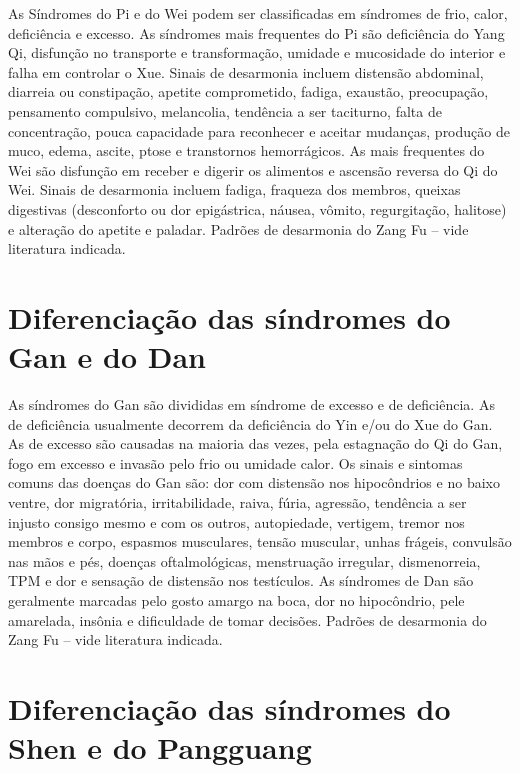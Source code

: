 \documentclass[12pt,oneside,a4paper]{book} %
\begin{document}
As Síndromes do Pi e do Wei podem ser classificadas em síndromes de frio, calor, deficiência e excesso. 
As síndromes mais frequentes do Pi são deficiência do Yang Qi, disfunção no transporte e transformação, umidade e mucosidade do interior e falha em controlar o Xue. Sinais de desarmonia incluem distensão abdominal, diarreia ou constipação, apetite comprometido, fadiga, exaustão, preocupação, pensamento compulsivo, melancolia, tendência a ser taciturno, falta de concentração, pouca capacidade para reconhecer e aceitar mudanças, produção de muco, edema, ascite, ptose e transtornos hemorrágicos.
As mais frequentes do Wei são disfunção em receber e digerir os alimentos e ascensão reversa do Qi do Wei. Sinais de desarmonia incluem fadiga, fraqueza dos membros, queixas digestivas (desconforto ou dor epigástrica, náusea, vômito, regurgitação, halitose) e alteração do apetite e paladar.
Padrões de desarmonia do Zang Fu – vide literatura indicada.

\section{Diferenciação das síndromes do Gan e do Dan}

As síndromes do Gan são divididas em síndrome de excesso e de deficiência. As de deficiência usualmente decorrem da deficiência do Yin e/ou do Xue do Gan. As de excesso são causadas na maioria das vezes, pela estagnação do Qi do Gan, fogo em excesso e invasão pelo frio ou umidade calor.
Os sinais e sintomas comuns das doenças do Gan são: dor com distensão nos hipocôndrios e no baixo ventre, dor migratória, irritabilidade, raiva, fúria, agressão, tendência a ser injusto consigo mesmo e com os outros, autopiedade, vertigem, tremor nos membros e corpo, espasmos musculares, tensão muscular, unhas frágeis, convulsão nas mãos e pés, doenças oftalmológicas, menstruação irregular, dismenorreia, TPM e dor e sensação de distensão nos testículos.
As síndromes de Dan são geralmente marcadas pelo gosto amargo na boca, dor no hipocôndrio, pele amarelada, insônia e dificuldade de tomar decisões.
Padrões de desarmonia do Zang Fu – vide literatura indicada.

\section{Diferenciação das síndromes do Shen e do Pangguang}
\end{document}
